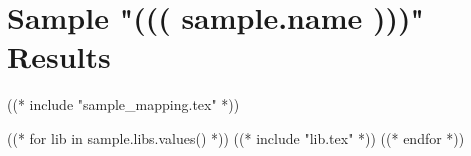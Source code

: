 \part{Sample "((( sample.name )))" Results}
\label{sample:(((sample.name)))}

((* include "sample_mapping.tex" *))

((* for lib in sample.libs.values() *))
((* include "lib.tex" *))
\clearpage
((* endfor *))
